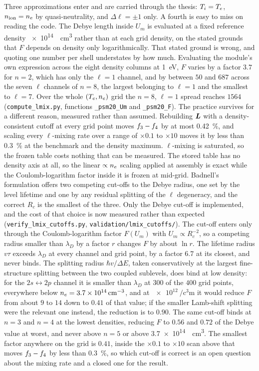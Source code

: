 Three approximations enter and are carried through the thesis: $T_i = T_e$,
$n_{\mathrm{ion}} = n_e$ by quasi-neutrality, and $\Delta\ell = \pm1$ only. A fourth is
easy to miss on reading the code. The Debye length inside $U_m$ is evaluated at
a fixed reference density \SI{e14}{\per\cubic\centi\metre} rather than at each
grid density, on the stated grounds that $F$ depends on density only
logarithmically. That stated ground is wrong, and quoting one number per shell
understates by how much. Evaluating the module's own expression across the eight
density columns at \SI{1}{\electronvolt}, $F$ varies by a factor $3.7$ for
$n=2$, which has only the $\ell=1$ channel, and by between $50$ and $687$ across
the seven $\ell$ channels of $n=8$, the largest belonging to $\ell=1$ and the
smallest to $\ell=7$. Over the whole $(T_e,n_e)$
grid the $n=8$, $\ell=1$ spread reaches $1564$ (\texttt{compute\_lmix.py},
functions \texttt{\_psm20\_Um} and \texttt{\_psm20\_F}). The practice survives
for a different reason, measured rather than assumed. Rebuilding $\bm{L}$ with a
density-consistent cutoff at every grid point moves $f_{3}-f_{4}$ by at
most \SI{0.42}{\percent}, and scaling every $\ell$-mixing rate over a range of
$\times0.1$ to $\times10$ moves it by less than \SI{0.3}{\percent} at the
benchmark and the density maximum. $\ell$-mixing is saturated, so the frozen
table costs nothing that can be measured. The stored table has no density axis
at all, so the linear $\propto n_e$ scaling applied at assembly is exact while
the Coulomb-logarithm factor inside it is frozen at mid-grid. Badnell's
formulation offers two competing cut-offs to the Debye radius, one
set by the level lifetime and one by any residual splitting of the $\ell$
degeneracy, and the correct $R_c$ is the smallest of the three. Only the Debye
cut-off is implemented, and the cost of that choice is now measured rather than
expected (\texttt{verify\_lmix\_cutoffs.py},
\texttt{validation/lmix\_cutoffs/}). The cut-off enters only through the
Coulomb-logarithm factor $F(U_m)$ with $U_m \propto R_c^{-2}$, so a competing
radius smaller than $\lambda_D$ by a factor $r$ changes $F$ by about $\ln r$.
The lifetime radius $v\tau$ exceeds $\lambda_D$ at every channel and grid
point, by a factor $6.7$ at its closest, and never binds. The splitting radius
$\hbar v/\Delta E$, taken conservatively at the largest fine-structure
splitting between the two coupled sublevels, does bind at low density: for
the $2s \leftrightarrow 2p$ channel it is smaller than $\lambda_D$ at $300$ of
the $400$ grid points, everywhere below $n_e = \SI{3.7e14}{\per\cubic\centi\metre}$,
and at $\SI{e12}{\per\cubic\centi\metre}$ it would reduce $F$ from about $9$
to $14$ down to $0.41$ of that value; if the smaller Lamb-shift splitting were
the relevant one instead, the reduction is to $0.90$. The same cut-off binds
at $n=3$ and $n=4$ at the lowest densities, reducing $F$ to $0.56$ and $0.72$
of the Debye value at worst, and never above $n=5$ or above
\SI{3.7e14}{\per\cubic\centi\metre}. The smallest factor anywhere on the grid
is $0.41$, inside the $\times0.1$ to $\times10$ scan above that moves
$f_{3}-f_{4}$ by less than \SI{0.3}{\percent}, so which cut-off is
correct is an open question about the mixing rate and a closed one for the
result.

